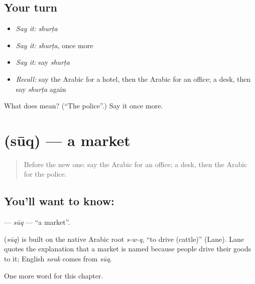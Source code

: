 \subsection*{Your turn}
\begin{itemize}
\raggedright
  \item \emph{Say it:} \emph{shurṭa}
  \item \emph{Say it:} \emph{shurṭa}, once more
  \item \emph{Say it:} say \emph{shurṭa}
  \item \emph{Recall:} say the Arabic for a hotel, then the Arabic for an office; a desk, then say \emph{shurṭa} again
\end{itemize}

\begin{tcolorbox}[breakable,colback=teal!4,colframe=teal!35!black,title={Before you move on}]
What does  mean? (\textquotedblleft{}The police\textquotedblright{}.) Say it once more.
\end{tcolorbox}
\section[\texorpdfstring{\ar{سوق} (sūq)}{سوق (sūq)}]{ (sūq) — a market}

\label{lesson:AR-C93-suq}



\begin{quote}
Before the new one: say the Arabic for an office; a desk, then the Arabic for the police.
\end{quote}

\subsection*{You'll want to know: }
\textbf{} — \emph{sūq} — \textquotedblleft{}a market\textquotedblright{}.

\begin{cousinweb}
\textbf{} (\emph{sūq}) is built on the native Arabic root \emph{s-w-q}, \textquotedblleft{}to drive (cattle)\textquotedblright{} (Lane). Lane quotes the explanation that a market is named because people drive their goods to it; English \emph{souk} comes from \emph{sūq}.
\end{cousinweb}

\begin{grammarlens}[title={What you've built}]
One more word for this chapter.
\end{grammarlens}

